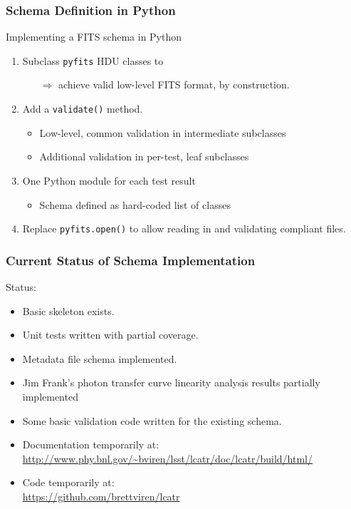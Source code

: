 \documentclass[xcolor=dvipsnames]{beamer}
\begin{document}
\begin{frame}
  \frametitle{Schema Definition in Python}

  Implementing a FITS schema in Python

  \vspace{5mm}

  \begin{enumerate}
  \item Subclass \texttt{pyfits} HDU classes to 
    \begin{itemize}
    \item[$\Rightarrow$] achieve valid low-level FITS format, by construction.
    \end{itemize}
  \item Add a \texttt{validate()} method.
    \begin{itemize}
    \item Low-level, common validation in intermediate subclasses
    \item Additional validation in per-test, leaf subclasses
    \end{itemize}
  \item One Python module for each test result
    \begin{itemize}
    \item  Schema defined as hard-coded list of classes
    \end{itemize}
  \item Replace \texttt{pyfits.open()} to allow reading in and validating compliant files.
  \end{enumerate}

\end{frame}

\begin{frame}
  \frametitle{Current Status of Schema Implementation}

  Status:
  \begin{itemize}
  \item Basic skeleton exists.
  \item Unit tests written with partial coverage.
  \item Metadata file schema implemented.
  \item Jim Frank's photon transfer curve linearity analysis results partially
    implemented
  \item Some basic validation code written for the existing schema. 
  \item Documentation temporarily at:\\
    {\footnotesize
    \url{http://www.phy.bnl.gov/~bviren/lsst/lcatr/doc/lcatr/build/html/}}
  \item Code temporarily at:\\
    {\footnotesize
    \url{https://github.com/brettviren/lcatr}}
  \end{itemize}

\end{frame}
\end{document}
